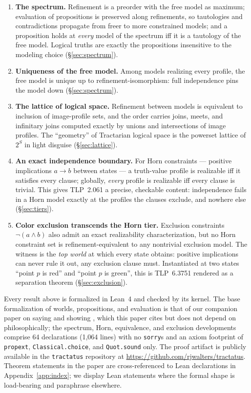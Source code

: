 \documentclass[10pt, letterpaper]{article}
\theoremstyle{remark}
\newcommand{\lean}[1]{\texttt{#1}}
\newcommand{\TLP}[1]{TLP~#1}
\begin{document}
\begin{enumerate}[label=(C\arabic*), leftmargin=3em]
\item\label{c:spectrum} \textbf{The spectrum.} Refinement is a preorder with
  the free model as maximum; evaluation of propositions is preserved along
  refinements, so tautologies and contradictions propagate from freer to more
  constrained models; and a proposition holds at \emph{every} model of the
  spectrum iff it is a tautology of the free model. Logical truths are
  exactly the propositions insensitive to the modeling choice
  (\S\ref{sec:spectrum}).
\item\label{c:unique} \textbf{Uniqueness of the free model.} Among models
  realizing every profile, the free model is unique up to
  refinement-isomorphism: full independence pins the model down
  (\S\ref{sec:spectrum}).
\item\label{c:lattice} \textbf{The lattice of logical space.} Refinement
  between models is equivalent to inclusion of image-profile sets, and the
  order carries joins, meets, and infinitary joins computed exactly by unions
  and intersections of image profiles. The ``geometry'' of Tractarian logical
  space is the powerset lattice of $2^S$ in light disguise
  (\S\ref{sec:lattice}).
\item\label{c:horn} \textbf{An exact independence boundary.} For Horn
  constraints --- positive implications $a \to b$ between states --- a
  truth-value profile is realizable iff it satisfies every clause; globally,
  \emph{every} profile is realizable iff every clause is trivial. This gives
  \TLP{2.061} a precise, checkable content: independence fails in a Horn model
  exactly at the profiles the clauses exclude, and nowhere else
  (\S\ref{sec:tiers}).
\item\label{c:exclusion} \textbf{Color exclusion transcends the Horn tier.}
  Exclusion constraints $\neg(a \wedge b)$ also admit an exact realizability
  characterization, but no Horn constraint set is refinement-equivalent to
  any nontrivial exclusion model. The witness is the \emph{top world} at
  which every state obtains: positive implications can never rule it out,
  any exclusion clause must. Instantiated at two states ``point $p$ is red''
  and ``point $p$ is green'', this is \TLP{6.3751} rendered as a separation
  theorem (\S\ref{sec:exclusion}).
\end{enumerate}

Every result above is formalized in Lean~4 \cite{moura2021} and checked by
its kernel. The base formalization of worlds, propositions, and evaluation is
that of our companion paper on saying and showing \cite{companion2026}, which
this paper cites but does not depend on philosophically; the spectrum, Horn,
equivalence, and exclusion developments comprise 64 declarations
(1{,}064 lines) with no \lean{sorry}s and an axiom footprint of
\lean{propext}, \lean{Classical.choice}, and \lean{Quot.sound} only. The
proof artifact is publicly available in the \lean{tractatus} repository at
\url{https://github.com/rjwalters/tractatus}. Theorem
statements in the paper are cross-referenced to Lean declarations in
Appendix~\ref{app:index}; we display Lean statements where the formal shape
is load-bearing and paraphrase elsewhere.
\end{document}

